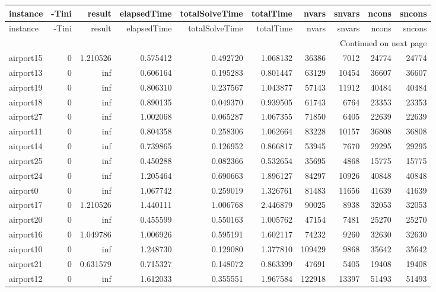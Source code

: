 
\begin{longtable}{|l|r|r|r|r|r|r|r|r|r|}
\toprule
instance & -Tini & result & elapsedTime & totalSolveTime & totalTime & nvars & snvars & ncons & sncons \\
\midrule
\endfirsthead
\toprule
instance & -Tini & result & elapsedTime & totalSolveTime & totalTime & nvars & snvars & ncons & sncons \\
\midrule
\endhead
\midrule
\multicolumn{10}{r}{Continued on next page} \\
\midrule
\endfoot
\bottomrule
\endlastfoot
airport15 & 0 & 1.210526 & 0.575412 & 0.492720 & 1.068132 & 36386 & 7012 & 24774 & 24774 \\
airport13 & 0 & inf & 0.606164 & 0.195283 & 0.801447 & 63129 & 10454 & 36607 & 36607 \\
airport19 & 0 & inf & 0.806310 & 0.237567 & 1.043877 & 57143 & 11912 & 40484 & 40484 \\
airport18 & 0 & inf & 0.890135 & 0.049370 & 0.939505 & 61743 & 6764 & 23353 & 23353 \\
airport27 & 0 & inf & 1.002068 & 0.065287 & 1.067355 & 71850 & 6405 & 22639 & 22639 \\
airport11 & 0 & inf & 0.804358 & 0.258306 & 1.062664 & 83228 & 10157 & 36808 & 36808 \\
airport14 & 0 & inf & 0.739865 & 0.126952 & 0.866817 & 53945 & 7670 & 29295 & 29295 \\
airport25 & 0 & inf & 0.450288 & 0.082366 & 0.532654 & 35695 & 4868 & 15775 & 15775 \\
airport24 & 0 & inf & 1.205464 & 0.690663 & 1.896127 & 84297 & 10926 & 40848 & 40848 \\
airport0 & 0 & inf & 1.067742 & 0.259019 & 1.326761 & 81483 & 11656 & 41639 & 41639 \\
airport17 & 0 & 1.210526 & 1.440111 & 1.006768 & 2.446879 & 90025 & 8938 & 32053 & 32053 \\
airport20 & 0 & inf & 0.455599 & 0.550163 & 1.005762 & 47154 & 7481 & 25270 & 25270 \\
airport16 & 0 & 1.049786 & 1.006926 & 0.595191 & 1.602117 & 74232 & 9260 & 32630 & 32630 \\
airport10 & 0 & inf & 1.248730 & 0.129080 & 1.377810 & 109429 & 9868 & 35642 & 35642 \\
airport21 & 0 & 0.631579 & 0.715327 & 0.148072 & 0.863399 & 47691 & 5405 & 19408 & 19408 \\
airport12 & 0 & inf & 1.612033 & 0.355551 & 1.967584 & 122918 & 13397 & 51493 & 51493 \\

\end{longtable}
